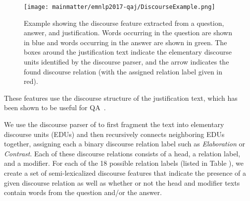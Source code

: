 \begin{figure}[t]
\begin{center}
\texttt{[image: mainmatter/emnlp2017-qaj/DiscourseExample.png]}
\caption{Example showing the discourse feature extracted from a question, answer, and justification.  Words occurring in the question are shown in blue and words occurring in the answer are shown in green.  The boxes around the justification text indicate the elementary discourse units identified by the discourse parser, and the arrow indicates the found discourse relation (with the assigned relation label given in red). }
\label{fig:discourseexample}
\vspace{-5mm}
\end{center}
\end{figure}

{}  These features use the discourse structure of the justification text, which has been shown to be useful for QA~\citep[][see also Chapter \ref{chapter:naacl2015}]{jansen14,sharp-EtAl:2015:NAACL-HLT, sachan2016science}. %

We use the discourse parser of \citet{Surdeanu:15} to first fragment the text into elementary discourse units (EDUs) and then recursively connects neighboring EDUs together, assigning each a binary discourse relation label such as \emph{Elaboration} or \emph{Contrast}. Each of these discourse relations consists of a head, a relation label, and a modifier. 
%
For each of the 18 possible relation labels (listed in Table ), we create 
a set of semi-lexicalized discourse features that indicate the presence of a given discourse relation as well as whether or not the head and modifier texts contain words from the question and/or the answer.  %

